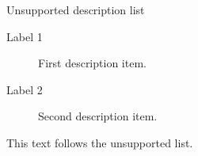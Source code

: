 \documentclass[14pt,t]{beamer-accessibility}
\begin{document}
\begin{frame}{Unsupported description list}
\begin{description}
  \item[Label 1] First description item.
  \item[Label 2] Second description item.
\end{description}
This text follows the unsupported list.
\end{frame}
\end{document}
